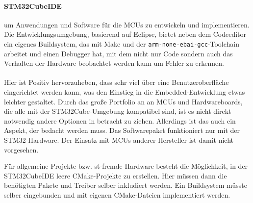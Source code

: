 \paragraph{STM32CubeIDE}
	um Anwendungen und Software für die MCUs zu entwickeln und implementieren.
	Die Entwicklungsumgebung, basierend auf Eclipse, bietet neben dem Codeeditor ein eigenes Buildsystem, das mit Make und der \texttt{arm-none-ebai-gcc}-Toolchain arbeitet und einen Debugger hat, mit dem nicht nur Code sondern auch das Verhalten der Hardware beobachtet werden kann um Fehler zu erkennen.
\\
\\
Hier ist Positiv hervorzuheben, dass sehr viel über eine Benutzeroberfläche eingerichtet werden kann, was den Einstieg in die Embedded-Entwicklung etwas leichter gestaltet.
Durch das große Portfolio an an MCUs und Hardwareboards, die alle mit der STM32Cube-Umgebung kompatibel sind, ist es nicht direkt notwendig andere Optionen in betracht zu ziehen. 
Allerdings ist das auch ein Aspekt, der bedacht werden muss. 
Das Softwarepaket funktioniert nur mit der STM32-Hardware.
Der Einsatz mit MCUs anderer Hersteller ist damit nicht vorgesehen.

Für allgemeine Projekte bzw. st-fremde Hardware besteht die Möglichkeit, in der STM32CubeIDE leere CMake-Projekte zu erstellen.
Hier müssen dann die benötigten Pakete und Treiber selber inkludiert werden.
Ein Buildsystem müsste selber eingebunden und mit eigenen CMake-Dateien implementiert werden.





